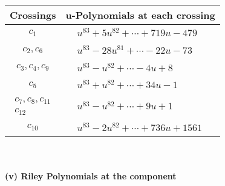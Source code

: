 \documentclass[1p]{elsarticle_modified}
\theoremstyle{definition}
\begin{document}
\begin{tabular}{m{50pt}|m{274pt}}
Crossings & \hspace{64pt}u-Polynomials at each crossing \\
\hline $$\begin{aligned}c_{1}\end{aligned}$$&$\begin{aligned}
&u^{83}+5 u^{82}+\cdots+719 u-479
\end{aligned}$\\
\hline $$\begin{aligned}c_{2},c_{6}\end{aligned}$$&$\begin{aligned}
&u^{83}-28 u^{81}+\cdots-22 u-73
\end{aligned}$\\
\hline $$\begin{aligned}c_{3},c_{4},c_{9}\end{aligned}$$&$\begin{aligned}
&u^{83}- u^{82}+\cdots-4 u+8
\end{aligned}$\\
\hline $$\begin{aligned}c_{5}\end{aligned}$$&$\begin{aligned}
&u^{83}+u^{82}+\cdots+34 u-1
\end{aligned}$\\
\hline $$\begin{aligned}c_{7},c_{8},c_{11}\\c_{12}\end{aligned}$$&$\begin{aligned}
&u^{83}- u^{82}+\cdots+9 u+1
\end{aligned}$\\
\hline $$\begin{aligned}c_{10}\end{aligned}$$&$\begin{aligned}
&u^{83}-2 u^{82}+\cdots+736 u+1561
\end{aligned}$\\
\hline
\end{tabular}\\~\\
\newpage\renewcommand{\arraystretch}{1}
\flushleft \textbf{(v) Riley Polynomials at the component}\newline \\
\end{document}
